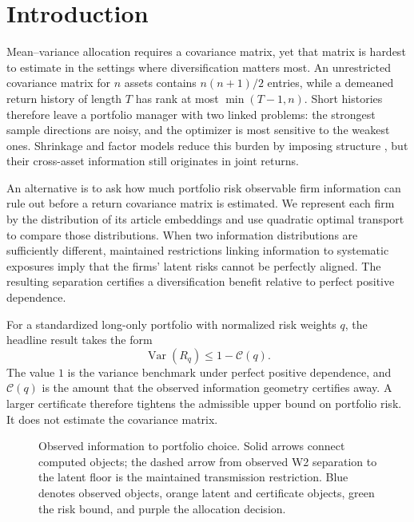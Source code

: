 \section{Introduction}\label{sec:introduction}

Mean--variance allocation requires a covariance matrix, yet that
matrix is hardest to estimate in the settings where diversification
matters most.
An unrestricted covariance matrix for $n$ assets contains $n(n+1)/2$
entries, while a demeaned return history of length $T$ has rank at
most $\min(T-1,n)$.
Short histories therefore leave a portfolio manager with two linked
problems: the strongest sample directions are noisy, and the
optimizer is most sensitive to the weakest ones.
Shrinkage and factor models reduce this burden by imposing structure
\citep{ledoit_wolf_2004,kelly_characteristics_2019}, but their
cross-asset information still originates in joint returns.

An alternative is to ask how much portfolio risk observable firm
information can rule out before a return covariance matrix is estimated.
We represent each firm by the distribution of its article embeddings
and use quadratic optimal transport to compare those distributions.
When two information distributions are sufficiently different,
maintained restrictions linking information to systematic exposures
imply that the firms' latent risks cannot be perfectly aligned.
The resulting separation certifies a diversification benefit relative
to perfect positive dependence.

For a standardized long-only portfolio with normalized risk weights
$q$, the headline result takes the form
\[
  \operatorname{Var}(R_q)\le 1-\mathcal C(q).
\]
The value $1$ is the variance benchmark under perfect positive dependence,
and $\mathcal C(q)$ is the amount that the observed information
geometry certifies away.
A larger certificate therefore tightens the admissible upper bound on
portfolio risk.
It does not estimate the covariance matrix.

\begin{figure}
  \centering
  \caption{Observed information to portfolio choice. Solid arrows connect
    computed objects; the dashed arrow from observed W2 separation to the
    latent floor is the maintained transmission restriction. Blue denotes
    observed objects, orange latent and certificate objects, green the risk
  bound, and purple the allocation decision.}
  \label{fig:p3-conceptual-pipeline}
\end{figure}

